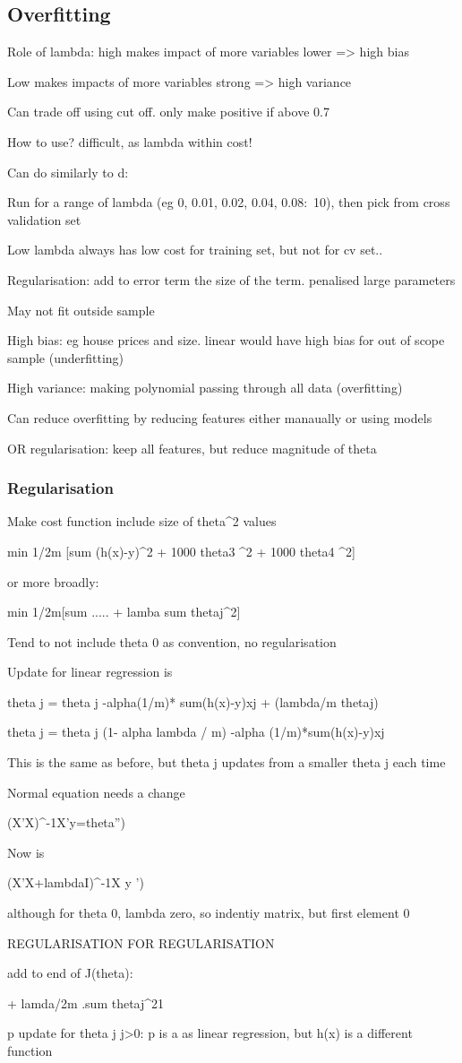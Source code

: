 
\subsection{Overfitting}

Role of lambda: high makes impact of more variables lower => high bias

Low makes impacts of more variables strong => high variance

Can trade off using cut off. only make positive if above 0.7

How to use? difficult, as lambda within cost!

Can do similarly to d:

Run for a range of lambda (eg 0, 0.01, 0.02, 0.04, 0.08:~10), then pick from cross validation set

Low lambda always has low cost for training set, but not for cv set..

Regularisation: add to error term the size of the term. penalised large parameters

May not fit outside sample

High bias: eg house prices and size. linear would have high bias for out of scope sample (underfitting)

High variance: making polynomial passing through all data (overfitting)

Can reduce overfitting by reducing features either manaually or using models

OR regularisation: keep all features, but reduce magnitude of theta

\subsubsection{Regularisation}

Make cost function include size of theta^2 values

min 1/2m [sum (h(x)-y)^2 + 1000 theta3 ^2 + 1000 theta4 ^2]

or more broadly:

min 1/2m[sum ..... + lamba sum thetaj^2]

Tend to not include theta 0 as convention, no regularisation

Update for linear regression is

theta j = theta j -alpha{(1/m)* sum(h(x)-y)xj + (lambda/m thetaj)}

theta j = theta j (1- alpha lambda / m) -alpha {(1/m)*sum(h(x)-y)xj}

This is the same as before, but theta j updates from a smaller theta j each time

Normal equation needs a change

(X'X)^-1X'y=theta'')

Now is

(X'X+lambdaI)^-1X y  ')

although for theta 0, lambda zero, so indentiy matrix, but first element 0

REGULARISATION FOR REGULARISATION

add to end of J(theta):

+ lamda/2m .sum thetaj^21

	p update for theta j j>0:
	p is a as linear regression, but h(x) is a different function
